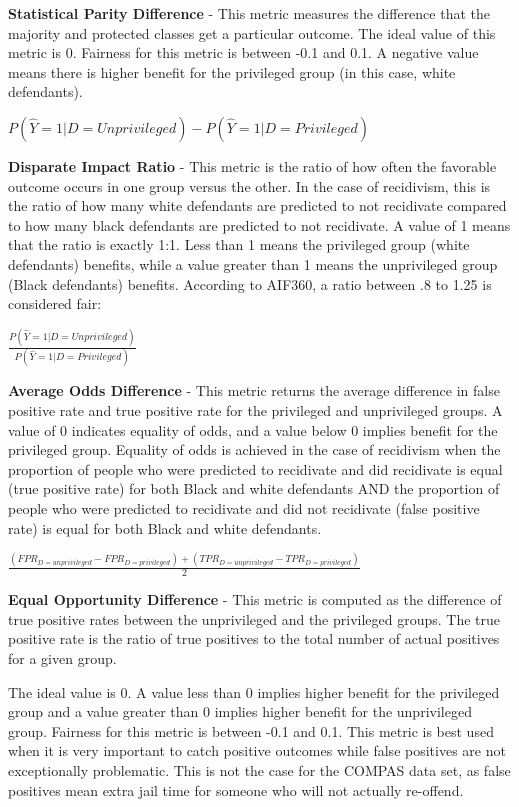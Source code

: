 \documentclass[water,article,submit,moreauthors,pdftex]{mdpi}
\begin{document}
\textbf{Statistical Parity Difference} - This metric measures the
difference that the majority and protected classes get a particular
outcome. The ideal value of this metric is 0. Fairness for this metric
is between -0.1 and 0.1. A negative value means there is higher benefit
for the privileged group (in this case, white defendants).

\(P(\hat{Y}=1|D=Unprivileged) - P(\hat{Y}=1|D=Privileged)\)

\textbf{Disparate Impact Ratio} - This metric is the ratio of how often
the favorable outcome occurs in one group versus the other. In the case
of recidivism, this is the ratio of how many white defendants are
predicted to not recidivate compared to how many black defendants are
predicted to not recidivate. A value of 1 means that the ratio is
exactly 1:1. Less than 1 means the privileged group (white defendants)
benefits, while a value greater than 1 means the unprivileged group
(Black defendants) benefits. According to AIF360, a ratio between .8 to
1.25 is considered fair:

\(\frac{P(\hat{Y}=1|D=Unprivileged)}{P(\hat{Y}=1|D=Privileged)}\)

\textbf{Average Odds Difference} - This metric returns the average
difference in false positive rate and true positive rate for the
privileged and unprivileged groups. A value of 0 indicates equality of
odds, and a value below 0 implies benefit for the privileged group.
Equality of odds is achieved in the case of recidivism when the
proportion of people who were predicted to recidivate and did recidivate
is equal (true positive rate) for both Black and white defendants AND
the proportion of people who were predicted to recidivate and did not
recidivate (false positive rate) is equal for both Black and white
defendants.

\(\frac{(FPR_{D = unprivileged} - FPR_{D = privileged}) + (TPR_{D = unprivileged} - TPR_{D = privileged})}{2}\)

\textbf{Equal Opportunity Difference} - This metric is computed as the
difference of true positive rates between the unprivileged and the
privileged groups. The true positive rate is the ratio of true positives
to the total number of actual positives for a given group.

The ideal value is 0. A value less than 0 implies higher benefit for the
privileged group and a value greater than 0 implies higher benefit for
the unprivileged group. Fairness for this metric is between -0.1 and
0.1. This metric is best used when it is very important to catch
positive outcomes while false positives are not exceptionally
problematic. This is not the case for the COMPAS data set, as false
positives mean extra jail time for someone who will not actually
re-offend.
\end{document}
